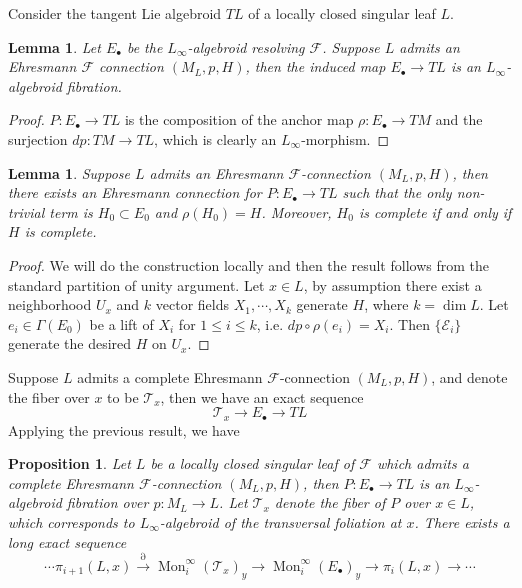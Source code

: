 \documentclass[12pt]{amsart}
\newtheorem{lem}[thm]{Lemma}
\newtheorem{prop}[thm]{Proposition}
\theoremstyle{definition}
\theoremstyle{remark}
\numberwithin{equation}{section}
\newcommand{\del}{\partial}
\renewcommand{\del}{\partial}
\newcommand{\CF}{{\mathcal F}}
\newcommand{\1}{{\mathbb{1}}}
\newcommand{\e}{\mathcal{E}}
\newcommand{\mon}{\operatorname{Mon}}
\begin{document}
Consider the tangent Lie algebroid $TL$ of a locally closed singular leaf $L$. 
\begin{lem} Let $E_{\bullet}$ be the $L_{\infty}$-algebroid resolving $\CF$. Suppose $L$ admits an Ehresmann $\CF$ connection $(M_L, p, H)$, then the induced map $E_{\bullet}\to TL$ is an $L_{\infty}$-algebroid fibration.
\end{lem}
\begin{proof}
 $P: E_{\bullet} \to TL$ is the composition of the anchor map $\rho: E_{\bullet} \to TM$ and the surjection $dp: TM\to TL$, which is clearly an $L_{\infty}$-morphism. 
\end{proof}

\begin{lem}
    Suppose $L$ admits an Ehresmann $\CF$-connection $(M_L, p, H)$, then there exists an Ehresmann connection for $P:E_{\bullet} \to TL$ such that the only non-trivial term is $H_{0} \subset E_0$ and $\rho(H_{0}) = H$. Moreover, $H_{0}$ is complete if and only if $H$ is complete.
\end{lem}
\begin{proof}
    We will do the construction locally and then the result follows from the standard partition of unity argument. Let $x\in L$, by assumption there exist a neighborhood $U_x$ and $k$ vector fields $X_1, \cdots, X_k$ generate $H$, where $k = \dim L$. Let $e_i \in \Gamma(E_0)$ be a lift of $X_i$ for $1\le i \le k$, i.e. $dp \circ \rho(e_i) = X_i$. Then $\{\e_i\}$ generate the desired $H$ on $U_x$. 
\end{proof}


Suppose $L$ admits a complete Ehresmann  $\CF$-connection $(M_L, p, H)$, and denote the fiber over $x$ to be $\mathcal{T}_x$, then we have an exact sequence
$$
\mathcal{T}_x \to E_{\bullet} \to TL
$$
Applying the previous result, we have 
\begin{prop}
Let $L$ be a locally closed singular leaf of $\CF$ which admits a complete Ehresmann $\CF$-connection $(M_L, p, H)$, then $P: E_{\bullet} \to TL$ is an $L_{\infty}$-algebroid fibration over $p:M_L \to L$. Let $\mathcal{T}_x$ denote the fiber of $P$ over $x\in L$, which corresponds to $L_{\infty}$-algebroid of the transversal foliation at $x$. There exists a long exact sequence
\begin{equation}
    \cdots \pi_{i+1}(L,x) \stackrel{\del}{\to} \mon^{\infty}_i(\mathcal{T}_x)_y \to \mon^{\infty}_i(E_{\bullet})_y\to \pi_i(L,x) \to \cdots
\end{equation}
\end{prop}
\end{document}
